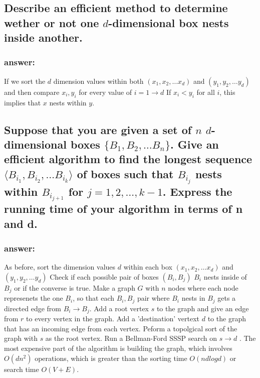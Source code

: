 \documentclass[titlepage]{article}
\theoremstyle{definition}
\begin{document}
  \subsection{Describe an efficient method to determine wether or not one
              $d$-dimensional box nests inside another.}
  \subsubsection{answer:}
    If we sort the $d$ dimension values within both $(x_1, x_2, \dots x_d)$ and
    $(y_1, y_2, \dots y_d)$ and then compare $x_i, y_i$ for every value of $i =
    1 \to d$ If $x_i <y_i$ for all $i$, this implies that $x$ nests within $y$.
    
  \subsection{Suppose that you are given a set of $n$ $d$-dimensional boxes
        $\{B_1, B_2,\dots B_n\}$. Give an efficient algorithm to find the longest
        sequence $\langle B_{i_1}, B_{i_2},\dots B_{i_k}\rangle$ of boxes such that
        $B_{i_j}$ nests within  $B_{i_{j+1}}$ for $j = 1,2,\dots,k-1$. Express the
        running time of your algorithm in terms of n and d.}
  \subsubsection{answer:}
    As before, sort the dimension values $d$ within each box $(x_1, x_2, \dots x_d)$ and
    $(y_1, y_2, \dots y_d)$ Check if each possible pair of boxes $(B_i, B_j)$
    $B_i$ nests inside of $B_j$ or if the converse is true. Make a graph $G$
    with $n$ nodes where each node represenets the one $B_i$, so that each
    $B_i, B_j$ pair where $B_i$ nests in $ B_j$ gets a directed edge from $B_i
    \to B_j$. Add a root vertex $s$ to the graph and give an edge from $r$ to
    every vertex in the graph. Add a 'destination' vertext $d$ to the graph
    that has an incoming edge from each vertex. Peform a topolgical sort of the
    graph with $s$ as the root vertex. Run a Bellman-Ford SSSP search on $s
    \rightarrow d$ . The most expensive part of the algorithm is building the
    graph, which involves $O(dn^2)$ operations, which is greater than the
    sorting time $O(nd log d)$ or search time $O(V + E)$. 
\end{document}
